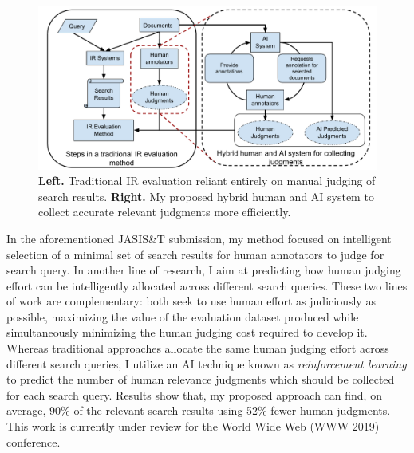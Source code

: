 \documentclass{article}
\begin{document}
\begin{figure}[ht]
\centerline{\includegraphics[width=1.0\textwidth]{AI_human_systems.pdf}} 
\vspace{-.5em}
\caption{{\bf Left.} Traditional IR evaluation reliant entirely on manual judging of search results. {\bf Right.} My proposed hybrid human and AI system to collect accurate relevant judgments more efficiently.}
\label{Figure:IR_evaluation}
\end{figure}





In the aforementioned JASIS\&T submission, my method focused on intelligent selection of a minimal set of search results for human annotators to judge for search query. In another line of research, I aim at predicting how human judging effort can be intelligently allocated across different search queries. These two lines of work are complementary: both seek to use human effort as judiciously as possible, maximizing the value of the evaluation dataset produced while simultaneously minimizing the human judging cost required to develop it. Whereas traditional approaches allocate the same human judging effort across different search queries, I utilize an AI technique known as {\it reinforcement learning} to predict the number of human relevance judgments which should be collected for each search query. Results show that, my proposed approach can find, on average, $90\%$ of the relevant
search results using 52\% fewer human judgments. This work \cite{Rahman:2019:TestCollection} is currently under review for the World Wide Web (WWW 2019) conference. \\ 
\end{document}
